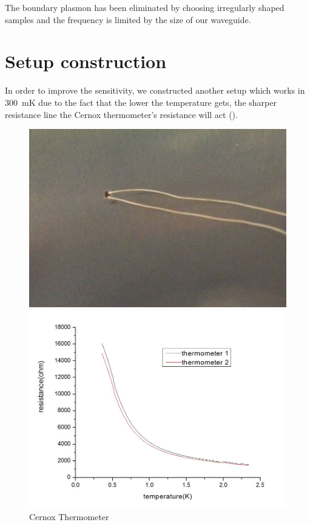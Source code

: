 \documentclass[12pt]{ruthesis}
\begin{document}
The boundary plasmon has been eliminated by choosing irregularly shaped samples and the frequency is limited by the size of our waveguide.

 
\section{Setup construction}\label{Construction}

In order to improve the sensitivity, we constructed another setup which works in \SI{300}{\milli\kelvin} due to the fact that the lower the temperature gets, the sharper resistance line the Cernox thermometer's resistance will act ().

\begin{figure}[!htb]\centering
   \begin{minipage}{0.3\textwidth}
     \includegraphics[width=\linewidth]{figures/thermometercx.JPG}
     \caption{Cernox Thermometer}\label{thermometer}
   \end{minipage}
   \begin {minipage}{0.3\textwidth}
     \includegraphics[width=\linewidth]{figures/R(T).JPG}

\end{minipage}
\end{figure}
\end{document}

